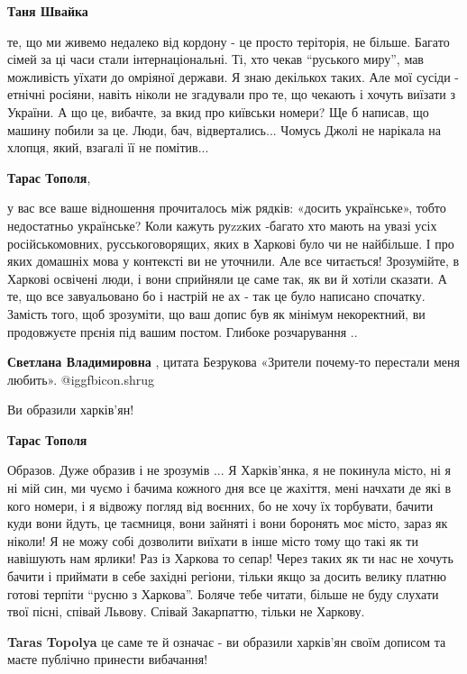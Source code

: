 \begin{itemize}
\begin{itemize}
\textbf{Таня Швайка} 

те, що ми живемо недалеко від кордону - це просто теріторія, не більше. Багато
сімей за ці часи стали інтернаціональні. Ті, хто чекав \enquote{руського миру}, мав
можливість уїхати до омріяної держави. Я знаю декількох таких. Але мої сусіди -
етнічні росіяни, навіть ніколи не згадували про те, що чекають і хочуть виїзати
з України. А що це, вибачте, за вкид про київськи номери? Ще б написав, що
машину побили за це. Люди, бач, відвертались... Чомусь Джолі не нарікала на
хлопця, який, взагалі її не помітив...

\textbf{Тарас Тополя}, 

у вас все ваше відношення прочиталось між рядків: «досить українське», тобто
недостатньо українське? Коли кажуть руzzких -багато хто мають на увазі усіх
російськомовних, русськоговорящих, яких в Харкові було чи не найбільше. І про
яких домашніх мова у контексті ви не уточнили. Але все читається! Зрозумійте, в
Харкові освічені люди, і вони сприйняли це саме так, як ви й хотіли сказати. А
те, що все завуальовано бо і настрій не ах - так це було написано спочатку.
Замість того, щоб зрозуміти, що ваш допис був як мінімум некоректний, ви
продовжуєте прєнія під вашим постом. Глибоке розчарування ..

\textbf{Светлана Владимировна} , цитата Безрукова «Зрители почему-то перестали меня любить».  @igg{fbicon.shrug}

Ви образили харків'ян!

\textbf{Тарас Тополя} 

Образов. Дуже образив і не зрозумів ... Я Харків'янка, я не покинула місто, ні
я ні мій син, ми чуємо і бачима кожного дня все це жахіття, мені начхати де які
в кого номери, і я відвожу погляд від воєнних, бо не хочу їх торбувати, бачити
куди вони йдуть, це таємниця, вони зайняті і вони боронять моє місто, зараз як
ніколи! Я не можу собі дозволити виїхати в інше місто тому що такі як ти
навішують нам ярлики! Раз із Харкова то сепар! Через таких як ти нас не хочуть
бачити і приймати в себе західні регіони, тільки якщо за досить велику платню
готові терпіти \enquote{русню з Харкова}. Боляче тебе читати, більше не буду слухати
твої пісні, співай Львову. Співай Закарпаттю, тільки не Харкову.

\textbf{Taras Topolya} це саме те й означає - ви образили харків'ян своїм дописом та маєте публічно принести вибачання!


\end{itemize}
\end{itemize}
